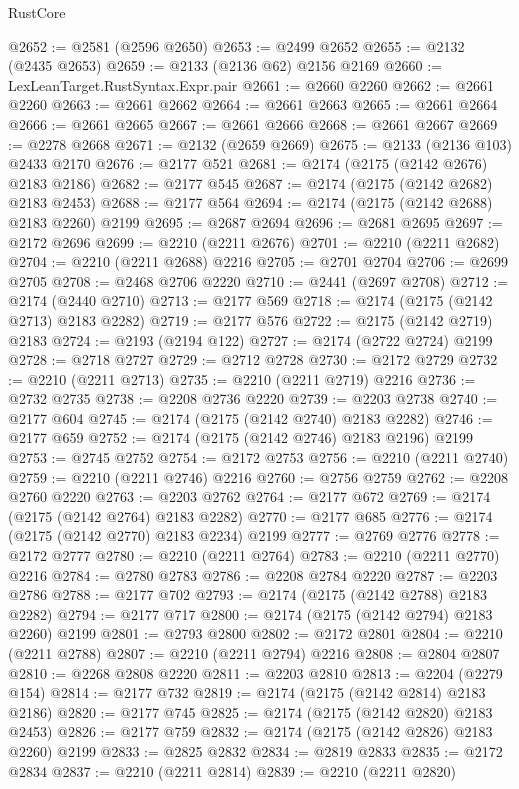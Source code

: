 \begin{lexlean}{RustCore}
\begin{coremodule}
@2652 := @2581 (@2596 @2650)
@2653 := @2499 @2652
@2655 := @2132 (@2435 @2653)
@2659 := @2133 (@2136 @62) @2156 @2169
@2660 := LexLeanTarget.RustSyntax.Expr.pair
@2661 := @2660 @2260
@2662 := @2661 @2260
@2663 := @2661 @2662
@2664 := @2661 @2663
@2665 := @2661 @2664
@2666 := @2661 @2665
@2667 := @2661 @2666
@2668 := @2661 @2667
@2669 := @2278 @2668
@2671 := @2132 (@2659 @2669)
@2675 := @2133 (@2136 @103) @2433 @2170
@2676 := @2177 @521
@2681 := @2174 (@2175 (@2142 @2676) @2183 @2186)
@2682 := @2177 @545
@2687 := @2174 (@2175 (@2142 @2682) @2183 @2453)
@2688 := @2177 @564
@2694 := @2174 (@2175 (@2142 @2688) @2183 @2260) @2199
@2695 := @2687 @2694
@2696 := @2681 @2695
@2697 := @2172 @2696
@2699 := @2210 (@2211 @2676)
@2701 := @2210 (@2211 @2682)
@2704 := @2210 (@2211 @2688) @2216
@2705 := @2701 @2704
@2706 := @2699 @2705
@2708 := @2468 @2706 @2220
@2710 := @2441 (@2697 @2708)
@2712 := @2174 (@2440 @2710)
@2713 := @2177 @569
@2718 := @2174 (@2175 (@2142 @2713) @2183 @2282)
@2719 := @2177 @576
@2722 := @2175 (@2142 @2719) @2183
@2724 := @2193 (@2194 @122)
@2727 := @2174 (@2722 @2724) @2199
@2728 := @2718 @2727
@2729 := @2712 @2728
@2730 := @2172 @2729
@2732 := @2210 (@2211 @2713)
@2735 := @2210 (@2211 @2719) @2216
@2736 := @2732 @2735
@2738 := @2208 @2736 @2220
@2739 := @2203 @2738
@2740 := @2177 @604
@2745 := @2174 (@2175 (@2142 @2740) @2183 @2282)
@2746 := @2177 @659
@2752 := @2174 (@2175 (@2142 @2746) @2183 @2196) @2199
@2753 := @2745 @2752
@2754 := @2172 @2753
@2756 := @2210 (@2211 @2740)
@2759 := @2210 (@2211 @2746) @2216
@2760 := @2756 @2759
@2762 := @2208 @2760 @2220
@2763 := @2203 @2762
@2764 := @2177 @672
@2769 := @2174 (@2175 (@2142 @2764) @2183 @2282)
@2770 := @2177 @685
@2776 := @2174 (@2175 (@2142 @2770) @2183 @2234) @2199
@2777 := @2769 @2776
@2778 := @2172 @2777
@2780 := @2210 (@2211 @2764)
@2783 := @2210 (@2211 @2770) @2216
@2784 := @2780 @2783
@2786 := @2208 @2784 @2220
@2787 := @2203 @2786
@2788 := @2177 @702
@2793 := @2174 (@2175 (@2142 @2788) @2183 @2282)
@2794 := @2177 @717
@2800 := @2174 (@2175 (@2142 @2794) @2183 @2260) @2199
@2801 := @2793 @2800
@2802 := @2172 @2801
@2804 := @2210 (@2211 @2788)
@2807 := @2210 (@2211 @2794) @2216
@2808 := @2804 @2807
@2810 := @2268 @2808 @2220
@2811 := @2203 @2810
@2813 := @2204 (@2279 @154)
@2814 := @2177 @732
@2819 := @2174 (@2175 (@2142 @2814) @2183 @2186)
@2820 := @2177 @745
@2825 := @2174 (@2175 (@2142 @2820) @2183 @2453)
@2826 := @2177 @759
@2832 := @2174 (@2175 (@2142 @2826) @2183 @2260) @2199
@2833 := @2825 @2832
@2834 := @2819 @2833
@2835 := @2172 @2834
@2837 := @2210 (@2211 @2814)
@2839 := @2210 (@2211 @2820)

\end{coremodule}
\end{lexlean}
